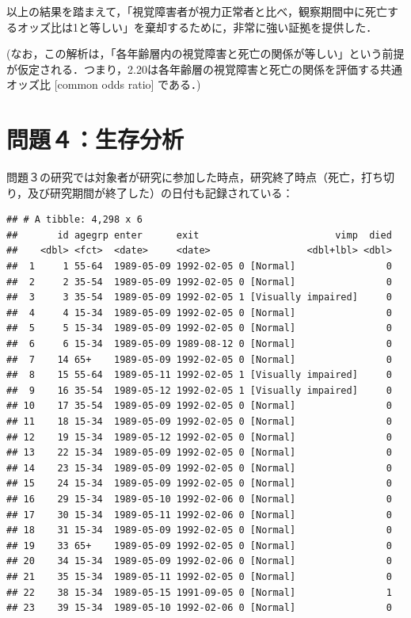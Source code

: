 \documentclass[11pt,]{problemset}
\begin{document}
以上の結果を踏まえて，「視覚障害者が視力正常者と比べ，観察期間中に死亡するオッズ比は1と等しい」を棄却するために，非常に強い証拠を提供した．

(なお，この解析は，「各年齢層内の視覚障害と死亡の関係が等しい」という前提が仮定される．つまり，2.20は各年齢層の視覚障害と死亡の関係を評価する共通オッズ比
{[}common odds ratio{]} である．)

\newpage
\vfill

\section{問題４：生存分析}

問題３の研究では対象者が研究に参加した時点，研究終了時点（死亡，打ち切り，及び研究期間が終了した）の日付も記録されている：

\begin{verbatim}
## # A tibble: 4,298 x 6
##       id agegrp enter      exit                        vimp  died
##    <dbl> <fct>  <date>     <date>                 <dbl+lbl> <dbl>
##  1     1 55-64  1989-05-09 1992-02-05 0 [Normal]                0
##  2     2 35-54  1989-05-09 1992-02-05 0 [Normal]                0
##  3     3 35-54  1989-05-09 1992-02-05 1 [Visually impaired]     0
##  4     4 15-34  1989-05-09 1992-02-05 0 [Normal]                0
##  5     5 15-34  1989-05-09 1992-02-05 0 [Normal]                0
##  6     6 15-34  1989-05-09 1989-08-12 0 [Normal]                0
##  7    14 65+    1989-05-09 1992-02-05 0 [Normal]                0
##  8    15 55-64  1989-05-11 1992-02-05 1 [Visually impaired]     0
##  9    16 35-54  1989-05-12 1992-02-05 1 [Visually impaired]     0
## 10    17 35-54  1989-05-09 1992-02-05 0 [Normal]                0
## 11    18 15-34  1989-05-09 1992-02-05 0 [Normal]                0
## 12    19 15-34  1989-05-12 1992-02-05 0 [Normal]                0
## 13    22 15-34  1989-05-09 1992-02-05 0 [Normal]                0
## 14    23 15-34  1989-05-09 1992-02-05 0 [Normal]                0
## 15    24 15-34  1989-05-09 1992-02-05 0 [Normal]                0
## 16    29 15-34  1989-05-10 1992-02-06 0 [Normal]                0
## 17    30 15-34  1989-05-11 1992-02-06 0 [Normal]                0
## 18    31 15-34  1989-05-09 1992-02-05 0 [Normal]                0
## 19    33 65+    1989-05-09 1992-02-05 0 [Normal]                0
## 20    34 15-34  1989-05-09 1992-02-06 0 [Normal]                0
## 21    35 15-34  1989-05-11 1992-02-05 0 [Normal]                0
## 22    38 15-34  1989-05-15 1991-09-05 0 [Normal]                1
## 23    39 15-34  1989-05-10 1992-02-06 0 [Normal]                0

\end{verbatim}
\end{document}
